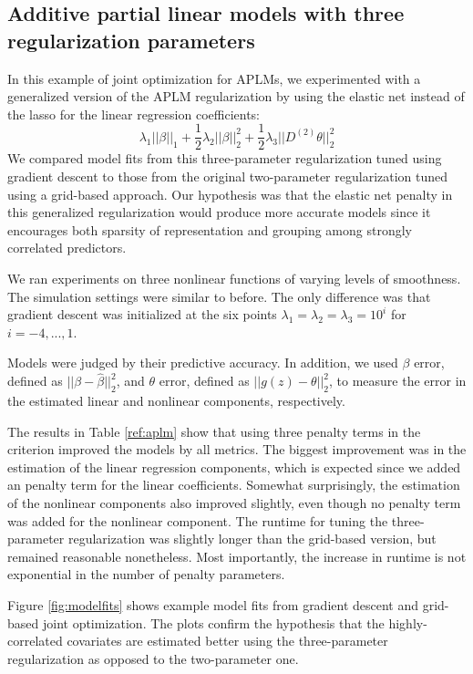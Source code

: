\documentclass[10pt,letterpaper]{article}
\begin{document}
\subsection{Additive partial linear models with three regularization parameters}
In this example of joint optimization for APLMs, we experimented with a generalized version of the APLM regularization by using the elastic net instead of the lasso for the linear regression coefficients:
\begin{equation}
\lambda_1 \lvert\lvert \beta \rvert \rvert_1
+ \frac{1}{2} \lambda_2 \lvert\lvert \beta \rvert \rvert_2^2
+ \frac{1}{2} \lambda_3 \lvert\lvert D^{(2)} \theta \rvert \rvert_2^2
\end{equation}
We compared model fits from this three-parameter regularization tuned using gradient descent to those from the original two-parameter regularization tuned using a grid-based approach. Our hypothesis was that the elastic net penalty in this generalized regularization would produce more accurate models since it encourages both sparsity of representation and grouping among strongly correlated predictors.

We ran experiments on three nonlinear functions of varying levels of smoothness. The simulation settings were similar to before. The only difference was that gradient descent was initialized at the six points $\lambda_1 = \lambda_2 = \lambda_3 =10^i$ for $i=-4, ..., 1$.

Models were judged by their predictive accuracy. In addition, we used $\beta$ error, defined as $||\beta - \hat \beta||_2^2$, and $\theta$ error, defined as $|| g(z) - \theta ||_2^2$, to measure the error in the estimated linear and nonlinear components, respectively.

The results in Table \ref{ref:aplm} show that using three penalty terms in the criterion improved the models by all metrics. The biggest improvement was in the estimation of the linear regression components, which is expected since we added an penalty term for the linear coefficients. Somewhat surprisingly, the estimation of the nonlinear components also improved slightly, even though no penalty term was added for the nonlinear component. The runtime for tuning the three-parameter regularization was slightly longer than the grid-based version, but remained reasonable nonetheless. Most importantly, the increase in runtime is not exponential in the number of penalty parameters.

Figure \ref{fig:modelfits} shows example model fits from gradient descent and grid-based joint optimization. The plots confirm the hypothesis that the highly-correlated covariates are estimated better using the three-parameter regularization as opposed to the two-parameter one.
\end{document}
